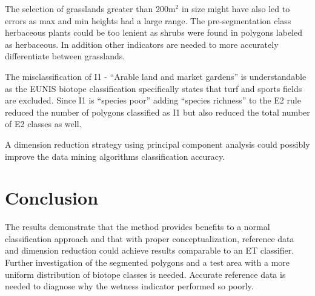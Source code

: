 \documentclass[authoryear,preprint,12pt,number]{elsarticle}
\begin{document}
% 
% 

The selection of grasslands greater than 200m$^{2}$ in size might have also led
to errors as max and min heights had a large range. The pre-segmentation class
herbaceous plants could be too lenient as shrubs were found in polygons labeled
as herbaceous. In addition other indicators are needed to more accurately
differentiate between grasslands.

The misclassification of I1 - ``Arable land and market gardens'' is 
understandable as the EUNIS biotope classification specifically states that 
turf and sports fields are excluded. Since I1 is ``species poor'' adding 
``species richness'' to the E2 rule reduced the number of polygons classified 
as I1 but also reduced the total number of E2 classes as well.

A dimension reduction strategy using principal component analysis could possibly
improve the data mining algorithms classification accuracy.
\section{Conclusion}
The results demonstrate that the method provides benefits to a normal
classification approach and that with proper conceptualization, reference data
and dimension reduction could achieve results comparable to an ET classifier.
Further investigation of the segmented polygons and a test area with a more
uniform distribution of biotope classes is needed. Accurate reference data is
needed to diagnose why the wetness indicator performed so poorly.
\end{document}
